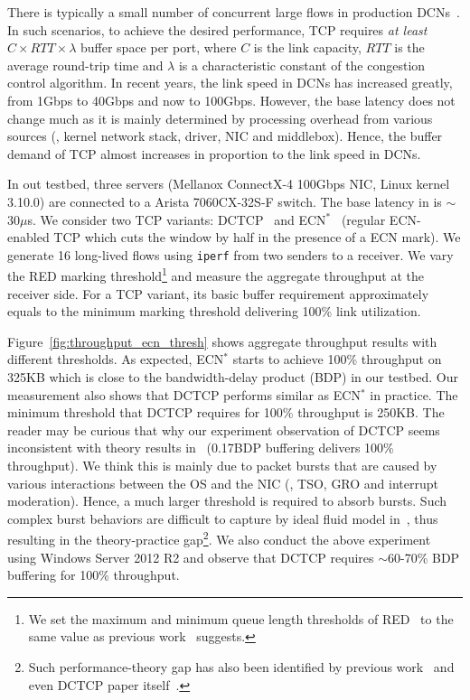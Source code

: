 There is typically a small number of concurrent large flows in production DCNs~\cite{dctcp}. In such scenarios, to achieve the desired performance, TCP requires \emph{at least} $C\times RTT \times \lambda$ buffer space per port, where $C$ is the link capacity, $RTT$ is the average round-trip time and $\lambda$ is a characteristic constant of the congestion control algorithm. In recent years, the link speed in DCNs has increased greatly, from 1Gbps to 40Gbps and now to 100Gbps. However, the base latency does not change much as it is mainly determined by processing overhead from various sources (\eg, kernel network stack, driver, NIC and middlebox). Hence, the buffer demand of TCP almost increases in proportion to the link speed in DCNs.

In out testbed, three servers (Mellanox ConnectX-4 100Gbps NIC, Linux kernel 3.10.0) are connected to a Arista 7060CX-32S-F switch. The base latency in is $\sim$30$\mu$s. We consider two TCP variants: DCTCP~\cite{dctcp} and ECN$^{*}$~\cite{tuning} (regular ECN-enabled TCP which cuts the window by half in the presence of a ECN mark). We generate 16 long-lived flows using \texttt{iperf} from two senders to a receiver. We vary the RED marking threshold\footnote{We set the maximum and minimum queue length thresholds of RED~\cite{RED} to the same value as previous work~\cite{dctcp,tuning} suggests.} and measure the aggregate throughput at the receiver side. For a TCP variant, its basic buffer requirement approximately equals to the minimum marking threshold delivering 100\% link utilization.

Figure~\ref{fig:throughput_ecn_thresh} shows aggregate throughput results with different thresholds.
As expected, ECN$^{*}$ starts to achieve 100\% throughput on 325KB which is close to the bandwidth-delay product (BDP) in our testbed. Our measurement also shows that DCTCP performs similar as ECN$^{*}$ in practice. The minimum threshold that DCTCP requires for 100\% throughput is 250KB. The reader may be curious that why our experiment observation of DCTCP seems inconsistent with theory results in~\cite{dctcp-analysis} (0.17BDP buffering delivers 100\% throughput). We think this is mainly due to packet bursts that are caused by various interactions between the OS and the NIC (\eg, TSO, GRO and interrupt moderation). Hence, a much larger threshold is required to absorb bursts. Such complex burst behaviors are difficult to capture by ideal fluid model in~\cite{dctcp-analysis}, thus resulting in the theory-practice gap\footnote{Such performance-theory gap has also been identified by previous work~\cite{tuning} and even DCTCP paper itself~\cite{dctcp}.}. We also conduct the above experiment using Windows Server 2012 R2 and observe that DCTCP requires $\sim$60-70\% BDP buffering for 100\% throughput.

